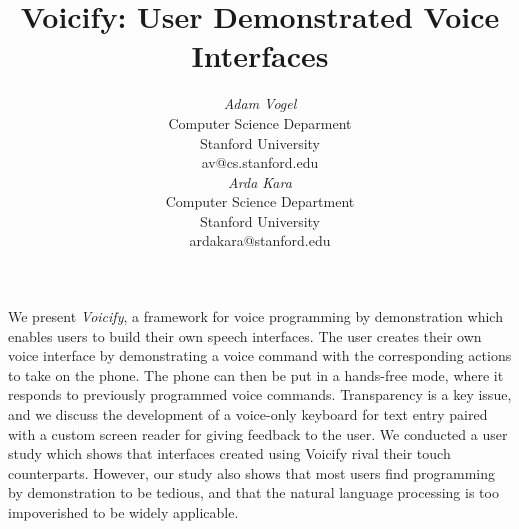 \documentclass[letterpaper]{article}
\begin{document}




\title{Voicify: User Demonstrated Voice Interfaces}



\author{
\parbox[t]{9cm}{\centering
	     {\em Adam Vogel}\\
     Computer Science Deparment\\
             Stanford University \\
	     av@cs.stanford.edu}
\parbox[t]{9cm}{\centering
	     {\em Arda Kara}\\
	     Computer Science Department\\
       Stanford University\\
	     ardakara@stanford.edu}
}

\maketitle

\abstract
We present \emph{Voicify}, a framework for voice programming by 
demonstration which enables users to build their own speech interfaces.
The user creates their own voice interface by demonstrating a voice command with the corresponding
actions to take on the phone. The phone can then be put in a hands-free mode, where it
responds to previously programmed voice commands. 
Transparency is a key issue, and we discuss the development of a voice-only keyboard for
text entry paired with a custom screen reader for giving feedback to the user.
We conducted a user study which shows that
interfaces created using Voicify rival their touch counterparts.
However, our study also shows that most users find programming by demonstration to be
tedious, and that the natural language processing is too impoverished to be widely applicable.
\end{document}
